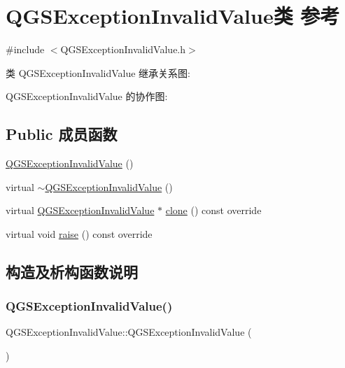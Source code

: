 \hypertarget{class_q_g_s_exception_invalid_value}{}\section{Q\+G\+S\+Exception\+Invalid\+Value类 参考}
\label{class_q_g_s_exception_invalid_value}


{\ttfamily \#include $<$Q\+G\+S\+Exception\+Invalid\+Value.\+h$>$}



类 Q\+G\+S\+Exception\+Invalid\+Value 继承关系图\+:


Q\+G\+S\+Exception\+Invalid\+Value 的协作图\+:
\subsection*{Public 成员函数}
\begin{DoxyCompactItemize}
\item 
\mbox{\hyperlink{class_q_g_s_exception_invalid_value_a2e80d5fdc0552d0f3d292107d570a5ab}{Q\+G\+S\+Exception\+Invalid\+Value}} ()
\item 
virtual \mbox{\hyperlink{class_q_g_s_exception_invalid_value_a61646727279a36733982569e5fb429dc}{$\sim$\+Q\+G\+S\+Exception\+Invalid\+Value}} ()
\item 
virtual \mbox{\hyperlink{class_q_g_s_exception_invalid_value}{Q\+G\+S\+Exception\+Invalid\+Value}} $\ast$ \mbox{\hyperlink{class_q_g_s_exception_invalid_value_a93d1a2fa41fb57aa9d68048497b5e16c}{clone}} () const override
\item 
virtual void \mbox{\hyperlink{class_q_g_s_exception_invalid_value_a6402f58552df25dca05ce46c10d17eef}{raise}} () const override
\end{DoxyCompactItemize}


\subsection{构造及析构函数说明}
\mbox{\label{class_q_g_s_exception_invalid_value_a2e80d5fdc0552d0f3d292107d570a5ab}} 
\subsubsection{\texorpdfstring{Q\+G\+S\+Exception\+Invalid\+Value()}{QGSExceptionInvalidValue()}}
{\footnotesize\ttfamily Q\+G\+S\+Exception\+Invalid\+Value\+::\+Q\+G\+S\+Exception\+Invalid\+Value (\begin{DoxyParamCaption}{ }\end{DoxyParamCaption})}

